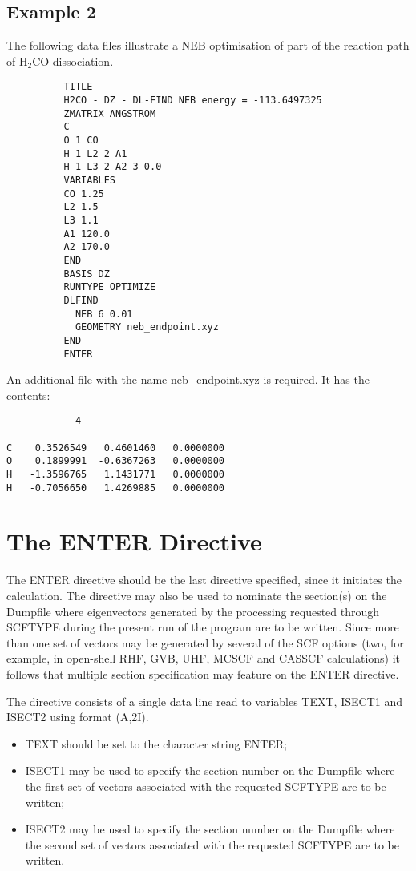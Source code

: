\documentclass[11pt,fleqn]{article}
\begin{document}
\subsection{Example 2}

The following data files illustrate a NEB optimisation of part of the reaction
path of H$_2$CO dissociation.

{
\footnotesize
\begin{verbatim}
          TITLE
          H2CO - DZ - DL-FIND NEB energy = -113.6497325
          ZMATRIX ANGSTROM
          C
          O 1 CO
          H 1 L2 2 A1
          H 1 L3 2 A2 3 0.0
          VARIABLES
          CO 1.25
          L2 1.5
          L3 1.1
          A1 120.0
          A2 170.0
          END
          BASIS DZ
          RUNTYPE OPTIMIZE
          DLFIND
            NEB 6 0.01
            GEOMETRY neb_endpoint.xyz
          END
          ENTER
\end{verbatim}
}

An additional file with the name neb\_endpoint.xyz is required. It has the
contents:

{
\footnotesize
\begin{verbatim}
            4

C    0.3526549   0.4601460   0.0000000
O    0.1899991  -0.6367263   0.0000000
H   -1.3596765   1.1431771   0.0000000
H   -0.7056650   1.4269885   0.0000000
\end{verbatim}
}

\section[The ENTER Directive]{The ENTER Directive}

The ENTER directive should be the last directive specified, since
it initiates the calculation. The directive may also be used to
nominate the section(s) on the Dumpfile where eigenvectors generated
by the processing requested through SCFTYPE during the present run of
the program are to be written. Since more than one set of vectors may be
generated by several of the SCF options (two, for example, in open-shell
RHF, GVB, UHF, MCSCF and CASSCF calculations) it follows that multiple
section specification may feature on the ENTER directive.

The directive consists of a single data line read to variables TEXT,
ISECT1 and ISECT2 using format (A,2I).
\begin{itemize}
\item TEXT should be set to the character string ENTER;
\item ISECT1 may be used to specify the section number on the Dumpfile
where the first set of vectors associated with the requested SCFTYPE
are to be written;
\item ISECT2 may be used to specify the section number on the Dumpfile
where the second set of vectors associated with the requested SCFTYPE
are to be written.
\end{itemize}
\end{document}

